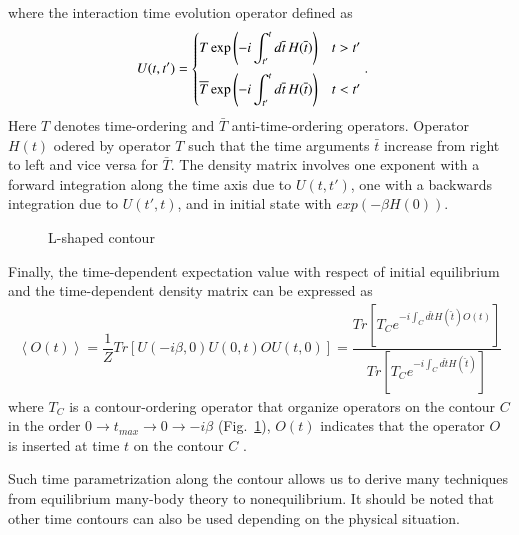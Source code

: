 where the interaction time evolution operator defined as
\begin{align}
U(t,t')
 &=
  \begin{cases}
   \vspace{.2cm}
   \displaystyle
   T \exp\left(-i\int_{t'}^t d\bar{t}\, H(\bar{t})\right) 
   & t>t'
   \\
   \displaystyle
   \bar{T} \exp\left(-i\int_{t'}^t d\bar{t}\, H(\bar{t})\right)
   & t<t'
  \end{cases}.
\label{U def}
\end{align}
Here $T$ denotes time-ordering and $\bar{T}$ anti-time-ordering operators. Operator $H(t)$ odered by operator $T$ such that the time
arguments $\bar{t}$ increase from right to left and vice versa for $\bar{T}$. The density matrix involves one exponent with a forward integration along the time axis due to $U(t,t')$, one with a backwards integration due to $U(t',t)$, and in initial state with $exp(- \beta H(0))$.
\begin{figure}[h!]
\caption{L-shaped contour}
\label{L-shaped contour}
\end{figure}

	
Finally, the time-dependent expectation value with respect of initial equilibrium and the time-dependent density matrix can be expressed as
\begin{align}
\left\langle O(t) \right\rangle =\dfrac{1}{Z}
Tr\left[ U(-i \beta,0) U(0,t) O U(t,0) \right] =
\dfrac{Tr\left[ T_C e^{-i \int_C d \hat{t} H(\hat{t}) O(t) } \right] }{Tr\left[ T_C e^{-i \int_C d \hat{t} H(\hat{t})} \right] }
\label{expectation value2}
\end{align}
where $T_{C}$ is a contour-ordering operator that organize operators on the contour $C$ in the order 
 $0 \rightarrow t_{max} \rightarrow 0 \rightarrow -i \beta$ (Fig.~\ref{L-shaped contour}), $O(t)$ indicates that the operator $O$ is inserted at time $t$ on the contour $C$ \citep{bookKadanoff_and_Baym}.
 
Such time parametrization along the contour allows us to derive many techniques from equilibrium many-body theory to nonequilibrium. 
It should be noted that other time contours can also be used depending on the physical situation.


